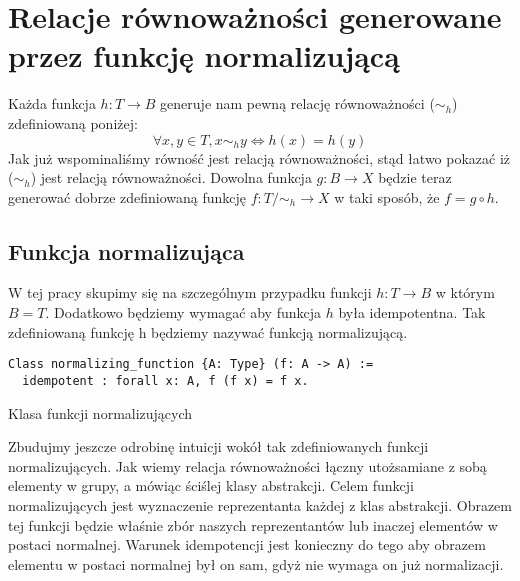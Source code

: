 \section{Relacje równoważności generowane przez funkcję normalizującą}
Każda funkcja $h: T \rightarrow B$ generuje nam pewną relację równoważności ($\sim_h$) zdefiniowaną poniżej:
\begin{equation}
    \forall x, y \in T, x \sim_h y \iff h(x) = h(y)
\end{equation}
Jak już wspominaliśmy równość jest relacją równoważności, stąd łatwo pokazać iż ($\sim_h$) jest relacją równoważności. Dowolna funkcja $g: B \rightarrow X$ będzie teraz generować dobrze zdefiniowaną funkcję $f: T /\sim_h \rightarrow X$ w taki sposób, że $f = g \circ h$.
\subsection{Funkcja normalizująca}
W tej pracy skupimy się na szczególnym przypadku funkcji $h: T \rightarrow B$ w którym $B = T$. Dodatkowo będziemy wymagać aby funkcja $h$ była idempotentna. Tak zdefiniowaną funkcję h będziemy nazywać funkcją normalizującą.
\begin{code}
\begin{verbatim}
Class normalizing_function {A: Type} (f: A -> A) := 
  idempotent : forall x: A, f (f x) = f x.
\end{verbatim}
\caption{Klasa funkcji normalizujących}
\label{normalizing_function}
\end{code}
Zbudujmy jeszcze odrobinę intuicji wokół tak zdefiniowanych funkcji normalizujących. Jak wiemy relacja równoważności łączny utożsamiane z sobą elementy w grupy, a mówiąc ściślej klasy abstrakcji. Celem funkcji normalizujących jest wyznaczenie reprezentanta każdej z klas abstrakcji. Obrazem tej funkcji będzie właśnie zbór naszych reprezentantów lub inaczej elementów w postaci normalnej. Warunek idempotencji jest konieczny do tego aby obrazem elementu w postaci normalnej był on sam, gdyż nie wymaga on już normalizacji.

